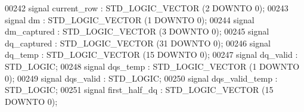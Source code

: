 \begin{DoxyCode}
00242                 \textcolor{keywordflow}{signal} \textcolor{vhdlchar}{current_row} \textcolor{vhdlchar}{:}  \textcolor{comment}{STD\_LOGIC\_VECTOR} \textcolor{vhdlchar}{(}\textcolor{vhdllogic}{}\textcolor{vhdllogic}{2} \textcolor{keywordflow}{DOWNTO} \textcolor{vhdllogic}{}\textcolor{vhdllogic}{0}\textcolor{vhdlchar}{)};
00243                 \textcolor{keywordflow}{signal} \textcolor{vhdlchar}{dm} \textcolor{vhdlchar}{:}  \textcolor{comment}{STD\_LOGIC\_VECTOR} \textcolor{vhdlchar}{(}\textcolor{vhdllogic}{}\textcolor{vhdllogic}{1} \textcolor{keywordflow}{DOWNTO} \textcolor{vhdllogic}{}\textcolor{vhdllogic}{0}\textcolor{vhdlchar}{)};
00244                 \textcolor{keywordflow}{signal} \textcolor{vhdlchar}{dm_captured} \textcolor{vhdlchar}{:}  \textcolor{comment}{STD\_LOGIC\_VECTOR} \textcolor{vhdlchar}{(}\textcolor{vhdllogic}{}\textcolor{vhdllogic}{3} \textcolor{keywordflow}{DOWNTO} \textcolor{vhdllogic}{}\textcolor{vhdllogic}{0}\textcolor{vhdlchar}{)};
00245                 \textcolor{keywordflow}{signal} \textcolor{vhdlchar}{dq_captured} \textcolor{vhdlchar}{:}  \textcolor{comment}{STD\_LOGIC\_VECTOR} \textcolor{vhdlchar}{(}\textcolor{vhdllogic}{}\textcolor{vhdllogic}{31} \textcolor{keywordflow}{DOWNTO} \textcolor{vhdllogic}{}\textcolor{vhdllogic}{0}\textcolor{vhdlchar}{)};
00246                 \textcolor{keywordflow}{signal} \textcolor{vhdlchar}{dq_temp} \textcolor{vhdlchar}{:}  \textcolor{comment}{STD\_LOGIC\_VECTOR} \textcolor{vhdlchar}{(}\textcolor{vhdllogic}{}\textcolor{vhdllogic}{15} \textcolor{keywordflow}{DOWNTO} \textcolor{vhdllogic}{}\textcolor{vhdllogic}{0}\textcolor{vhdlchar}{)};
00247                 \textcolor{keywordflow}{signal} \textcolor{vhdlchar}{dq_valid} \textcolor{vhdlchar}{:}  \textcolor{comment}{STD\_LOGIC};
00248                 \textcolor{keywordflow}{signal} \textcolor{vhdlchar}{dqs_temp} \textcolor{vhdlchar}{:}  \textcolor{comment}{STD\_LOGIC\_VECTOR} \textcolor{vhdlchar}{(}\textcolor{vhdllogic}{}\textcolor{vhdllogic}{1} \textcolor{keywordflow}{DOWNTO} \textcolor{vhdllogic}{}\textcolor{vhdllogic}{0}\textcolor{vhdlchar}{)};
00249                 \textcolor{keywordflow}{signal} \textcolor{vhdlchar}{dqs_valid} \textcolor{vhdlchar}{:}  \textcolor{comment}{STD\_LOGIC};
00250                 \textcolor{keywordflow}{signal} \textcolor{vhdlchar}{dqs_valid_temp} \textcolor{vhdlchar}{:}  \textcolor{comment}{STD\_LOGIC};
00251                 \textcolor{keywordflow}{signal} \textcolor{vhdlchar}{first_half_dq} \textcolor{vhdlchar}{:}  \textcolor{comment}{STD\_LOGIC\_VECTOR} \textcolor{vhdlchar}{(}\textcolor{vhdllogic}{}\textcolor{vhdllogic}{15} \textcolor{keywordflow}{DOWNTO} \textcolor{vhdllogic}{}\textcolor{vhdllogic}{0}\textcolor{vhdlchar}{)};

\end{DoxyCode}
